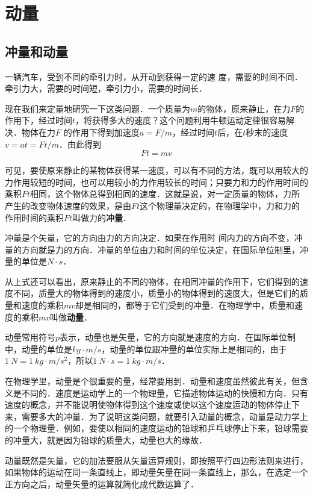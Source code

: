 

\chapter{动量}
\section{冲量和动量}

一辆汽车，受到不同的牵引力时，从开动到获得一定的速
度，需要的时间不同．牵引力大，需要的时间短，牵引力小，需要的时间长．

现在我们来定量地研究一下这类问题．一个质量为$m$的物体，原来静止，在力$F$的作用下，经过时间$t$，将获得多大的速度？这个问题利用牛顿运动定律很容易解决．物体在力$F$
的作用下得到加速度$a=F/m$，经过时间$t$后，在$t$秒末的速度
$v=at=Ft/m$．由此得到
\[Ft=mv\]

可见，要使原来静止的某物体获得某一速度，可以有不同的方法，既可以用较大的力作用较短的时间，也可以用较小的力作用较长的时间；只要力和力的作用时间的乘积$Ft$相同，这个物体总得到相同的速度．这就是说，对一定质量的物体，力所产生的改变物体速度的效果，是由$Ft$这个物理量决定的，在物理学中，力和力的作用时间的乘积$Ft$叫做力的\textbf{冲量}．

冲量是个矢量，它的方向由力的方向决定．如果在作用时
间内力的方向不变，冲量的方向就是力的方向．冲量的单位由力和时间的单位决定，在国际单位制里，冲量的单位是$\unit{N\cdot s}$．

从上式还可以看出，原来静止的不同的物体，在相同冲量的作用下，它们得到的速度不同，质量大的物体得到的速度小，质量小的物体得到的速度大，但是它们的质量和速度的乘积$mv$却是相同的，都等于它们受到的冲量．在物理学中，质量和速度的乘积$mv$叫做\textbf{动量}．

动量常用符号$p$表示，动量也是矢量，它的方向就是速度的方向．在国际单位制中，动量的单位是$\unit{kg\cdot m/s}$，动量的单位跟冲量的单位实际上是相同的，由于$\qty{1}{N}=\qty{1}{kg\cdot m/s^{2}}$，所以$\qty{1}{N\cdot s}=\qty{1}{kg\cdot m/s}$．

在物理学里，动量是个很重要的量，经常要用到．动量和速度虽然彼此有关，但含义是不同的．速度是运动学上的一个物理量，它描述物体运动的快慢和方向．只有速度的概念，并不能说明使物体得到这个速度或使以这个速度运动的物体停止下来，需要多大的冲量．为了说明这类问题，就要引入动量的概念，动量是动力学上的一个物理量．例如，要使以相同的速度运动的铅球和乒乓球停止下来，铅球需要的冲量大，就是因为铅球的质量大，动量也大的缘故．

动量既然是矢量，它的加法要服从矢量运算规则，即按照平行四边形法则来进行，如果物体的运动在同一条直线上，即动量矢量在同一条直线上，那么，在选定一个正方向之后，动量矢量的运算就简化成代数运算了．


